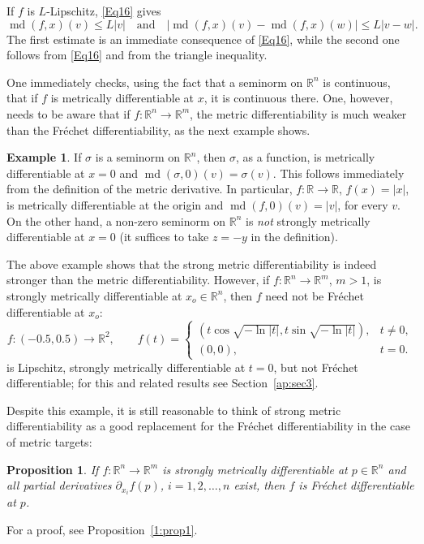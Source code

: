\documentclass[12pt,leqno]{amsart}
\newtheorem{proposition}[theorem]{Proposition}
\theoremstyle{definition}
\newtheorem{example}[theorem]{Example}
\newcommand{\bbbr}{\mathbb R}
\def\md{\operatorname{md}}
\numberwithin{theorem}{section} \numberwithin{equation}{section}
\begin{document}
If $f$ is $L$-Lipschitz, \eqref{Eq16} gives
\begin{equation}
\label{Eq11}
\md(f,x)(v) \leq L|v|
\quad
\text{and}
\quad
|\md(f,x)(v)-\md(f,x)(w)|\leq  L|v-w|.
\end{equation}
The first estimate is an immediate consequence of \eqref{Eq16}, while the second one follows from \eqref{Eq16} and from the triangle inequality.

One immediately checks, using the fact that a seminorm on $\bbbr^n$ is continuous, that if $f$ is metrically differentiable at $x$, it is continuous there. One, however, needs to be aware that if $f:\bbbr^n\to\bbbr^m$, the metric differentiability is much weaker than the Fr\'echet differentiability, as the next example shows.
\begin{example}
\label{ex:abs}
If $\sigma$ is a seminorm on $\bbbr^n$, then $\sigma$, as a function, is metrically differentiable at $x=0$ and $\md(\sigma,0)(v)=\sigma(v)$. This follows immediately from the definition of the metric derivative. In particular,
$f:\bbbr\to\bbbr$, $f(x)=|x|$, is metrically differentiable at the origin and $\md (f,0)(v)=|v|$, for every $v$.
On the other hand, a non-zero seminorm on $\bbbr^n$ is {\em not} strongly metrically differentiable at $x=0$ (it suffices to take $z=-y$ in the definition).
\end{example}
The above example shows that the strong metric differentiability is indeed stronger than the metric differentiability.
However, if $f:\bbbr^n\to\bbbr^m$, $m>1$, is strongly metrically differentiable at $x_o\in\bbbr^n$, then $f$ need not be Fr\'echet differentiable at $x_o$:
$$
f:(-0.5,0.5)\to\bbbr^2,
\qquad
f(t)=\begin{cases}
\left(t\cos\sqrt{-\ln |t|},t\sin\sqrt{-\ln |t|}\right),&t\neq0,\\
(0,0),&t=0.
\end{cases}
$$
is Lipschitz, strongly metrically differentiable at $t=0$, but not Fr\'echet differentiable; for this and related results see Section~\ref{ap:sec3}.

Despite this example, it is still reasonable to think of strong metric differentiability as a good replacement for the Fr\'echet differentiability in the case of metric targets:
\begin{proposition}
\label{MDT1}
If $f:\bbbr^n\to\bbbr^m$ is strongly metrically differentiable at $p\in\bbbr^n$ and all partial derivatives $\partial_{x_i}f(p)$, $i=1,2,\ldots,n$ exist, then $f$ is Fr\'echet differentiable at $p$.
\end{proposition}
For a proof, see Proposition~\ref{1:prop1}.
\end{document}

